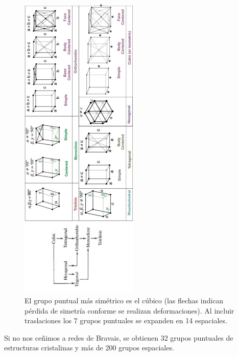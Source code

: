 \begin{figure}
  \centering
  \includegraphics[width=0.5\textwidth]{figures/bravaisgroups.png}
  \caption{El grupo puntual más simétrico es el cúbico (las flechas indican pérdida de simetría conforme se realizan deformaciones). Al incluir traslaciones los 7 grupos puntuales se expanden en 14 espaciales.}
  \label{fig:bravaisgroups}
\end{figure}

Si no nos ceñimos a redes de Bravais, se obtienen 32 grupos puntuales
de estructuras cristalinas y más de 200 grupos espaciales.

